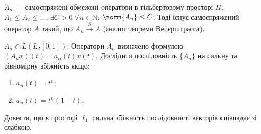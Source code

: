 \begin{exercise}
    $A_n$ --- самоспряжені обмежені оператори в гільбертовому просторі $H$,
    $A_1 \leq A_2 \leq \dots$; $\exists C > 0 \; \forall n \in \mathbb{N}$: $\norm{A_n}\leq C$.
    Тоді існує самоспряжений оператор $A$ такий, що $A_n \overset{S}{\to} A$
    (аналог теореми Вейєрштрасса).
\end{exercise}

\begin{exercise}
    $A_n \in L(L_2[0;1])$. Оператори $A_n$ визначено формулою $(A_n x)(t) = a_n(t) x(t)$.
    Дослідити послідовність $\{A_n\}$ на сильну та рівномірну збіжність якщо:
    \begin{enumerate}
        \item $a_n(t) = t^n$;
        \item $a_n(t) = t^n (1-t)$.
    \end{enumerate}
\end{exercise}

\begin{exercise*}
    Довести, що в просторі $\ell_1$ сильна збіжність послідовності векторів співпадає зі слабкою.
\end{exercise*}